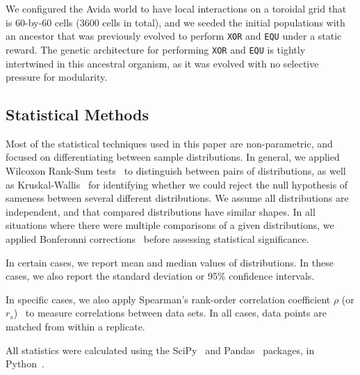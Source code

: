 \documentclass[10pt,letterpaper,final]{article}
\begin{document}
We configured the Avida world to have local interactions on a toroidal grid that is 60-by-60 cells (3600 cells in total), and we seeded the initial populations with an ancestor that was previously evolved to perform \texttt{XOR} and \texttt{EQU} under a static reward. The genetic architecture for performing \texttt{XOR} and \texttt{EQU} is tightly intertwined in this ancestral organism, as it was evolved with no selective pressure for modularity.

\subsection*{Statistical Methods}
Most of the statistical techniques used in this paper are non-parametric, and focused on differentiating between sample distributions. In general, we applied Wilcoxon Rank-Sum tests~\cite{wilcoxon_individual_1945} to distinguish between pairs of distributions, as well as Kruskal-Wallis~\cite{kruskal_use_1952} for identifying whether we could reject the null hypothesis of sameness between several different distributions. We assume all distributions are independent, and that compared distributions have similar shapes. In all situations where there were multiple comparisons of a given distributions, we applied Bonferonni corrections~\cite{rice_analyzing_1989} before assessing statistical significance. 

In certain cases, we report mean and median values of distributions. In these cases, we also report the standard deviation or 95\% confidence intervals.

In specific cases, we also apply Spearman's rank-order correlation coefficient $\rho$ (or $r_{s}$)~\cite{spearman_proof_1904} to measure correlations between data sets. In all cases, data points are matched from within a replicate.

All statistics were calculated using the SciPy~\cite{jones_scipy:_2014} and Pandas~\cite{mckinney_data_2010} packages, in Python~\cite{vanrossum_python_2010}.
\end{document}
